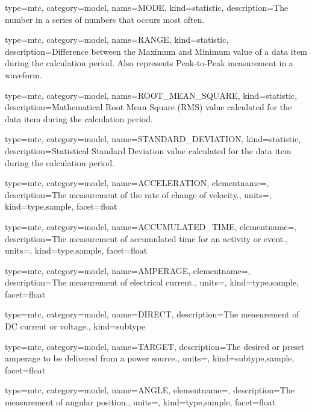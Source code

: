 {
  type=mtc,
  category=model,
  name={MODE},
  kind={statistic},
  description={The number in a series of numbers that occurs most often.}
}


{
  type=mtc,
  category=model,
  name={RANGE},
  kind={statistic},
  description={Difference between the Maximum and Minimum value of a data item during the calculation period.  Also represents Peak-to-Peak measurement in a waveform.}
}


{
  type=mtc,
  category=model,
  name={ROOT\_MEAN\_SQUARE},
  kind={statistic},
  description={Mathematical Root Mean Square (RMS) value calculated for the data item during the calculation period.}
}


{
  type=mtc,
  category=model,
  name={STANDARD\_DEVIATION},
  kind={statistic},
  description={Statistical Standard Deviation value calculated for the data item during the calculation period.}
}


{
  type=mtc,
  category=model,
  name={ACCELERATION},
  elementname=,
  description={The measurement of the rate of change of velocity.},
  units=,
  kind={type,sample},
  facet={\gls{float}}
}


{
  type=mtc,
  category=model,
  name={ACCUMULATED\_TIME},
  elementname=,
  description={The measurement of accumulated time for an activity or event.},
  units=,
  kind={type,sample},
  facet={\gls{float}}
}


{
  type=mtc,
  category=model,
  name={AMPERAGE},
  elementname=,
  description={The measurement of electrical current.},
  units=,
  kind={type,sample},
  facet={\gls{float}}
}



{
  type=mtc,
  category=model,
  name={DIRECT},
  description={The measurement of DC current or voltage.},
  kind={subtype}
}


{
  type=mtc,
  category=model,
  name={TARGET},
  description={The desired or preset amperage to be delivered from a power source.},
  units=,
  kind={subtype,sample},
  facet={\gls{float}}
}


{
  type=mtc,
  category=model,
  name={ANGLE},
  elementname=,
  description={The measurement of angular position.},
  units=,
  kind={type,sample},
  facet={\gls{float}}
}


